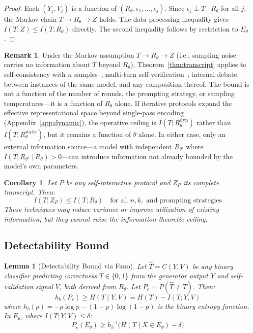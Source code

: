 \documentclass[11pt,a4paper]{article}
\newtheorem{lemma}{Lemma}[section]
\newtheorem{corollary}{Corollary}[section]
\theoremstyle{definition}
\newtheorem{remark}{Remark}[section]
\newcommand{\Rtheta}{R_\theta}
\begin{document}
\begin{proof}
Each $(Y_j, V_j)$ is a function of $(\Rtheta, \epsilon_1, \ldots, \epsilon_j)$. Since $\epsilon_j \perp T \mid \Rtheta$ for all $j$, the Markov chain $T \to \Rtheta \to Z$ holds. The data processing inequality gives $I(T;Z) \leq I(T;\Rtheta)$ directly. The second inequality follows by restriction to $E_\theta$.
\end{proof}

\begin{remark}
Under the Markov assumption $T \to \Rtheta \to Z$ (i.e., sampling noise carries no information about $T$ beyond $\Rtheta$), Theorem~\ref{thm:transcript} applies to self-consistency with $n$ samples~\cite{wang2023selfconsistency}, multi-turn self-verification~\cite{weng2023selfverification}, internal debate between instances of the same model, and any composition thereof. The bound is not a function of the number of rounds, the prompting strategy, or sampling temperatures---it is a function of $\Rtheta$ alone. If iterative protocols expand the effective representational space beyond single-pass encoding (Appendix~\ref{app:dynamic}), the operative ceiling is $I(T; R_\theta^\text{dyn})$ rather than $I(T; R_\theta^\text{static})$, but it remains a function of $\theta$ alone. In either case, only an external information source---a model with independent $R_{\theta'}$ where $I(T; R_{\theta'} \mid \Rtheta) > 0$---can introduce information not already bounded by the model's own parameters.
\end{remark}

\begin{corollary}
\label{cor:nonewinf}
Let $P$ be any self-interactive protocol and $Z_P$ its complete transcript. Then:
\begin{equation}
I(T; Z_P) \leq I(T; \Rtheta) \quad \text{for all } n, k, \text{ and prompting strategies}
\end{equation}
These techniques may reduce variance or improve utilization of existing information, but they cannot raise the information-theoretic ceiling.
\end{corollary}


\subsection{Detectability Bound}

\begin{lemma}[Detectability Bound via Fano]
\label{lem:fano}
Let $\hat{T} = C(Y, V)$ be any binary classifier predicting correctness $T \in \{0,1\}$ from the generator output $Y$ and self-validation signal $V$, both derived from $\Rtheta$. Let $P_e = P(\hat{T} \neq T)$. Then:
\begin{equation}
h_b(P_e) \geq H(T \mid Y, V) = H(T) - I(T; Y, V)
\end{equation}
where $h_b(p) = -p \log p - (1-p) \log(1-p)$ is the binary entropy function. In $E_\theta$, where $I(T; Y, V) \leq \delta$:
\begin{equation}
P_e(E_\theta) \geq h_b^{-1}\bigl(H(T \mid X \in E_\theta) - \delta\bigr)
\end{equation}
\end{lemma}
\end{document}
